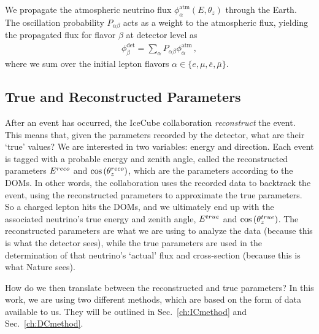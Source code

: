 We propagate the atmospheric neutrino flux $\phi_\alpha^\text{atm}(E,\theta_z)$ through the Earth.
The oscillation probability $P_{\alpha \beta}$ acts as a weight to the atmospheric flux, yielding the propagated flux for flavor $\beta$ at detector level as 
\begin{align}\label{eq:propFlux}
    \phi_\beta^\text{det} = \sum_\alpha P_{\alpha\beta} \phi_\alpha^\text{atm} \,,
\end{align}
where we sum over the initial lepton flavors $\alpha \in \{e,\mu, \bar{e}, \bar{\mu}\}$.

\subsection{True and Reconstructed Parameters}
After an event has occurred, the IceCube collaboration \emph{reconstruct} the event. 
This means that, given the parameters recorded by the detector, what are their `true' values?
We are interested in two variables: energy and direction. Each event is tagged with a probable energy and zenith angle, 
called the reconstructed parameters $E^{reco}$ and $\cos{(\theta_z^{reco})}$, which are the parameters according to the DOMs.
In other words, the collaboration uses the recorded data to backtrack the event, using the reconstructed parameters to approximate the true parameters. 
So a charged lepton hits the DOMs, and we ultimately end up with the associated neutrino's true energy and zenith angle, $E^{true}$ and $\cos{(\theta_z^{true})}$. 
The reconstructed parameters are what we are using to analyze the data (because this is what the detector sees), while the true parameters are used in the 
determination of that neutrino's `actual' flux and cross-section (because this is what Nature sees).

How do we then translate between the reconstructed and true parameters? 
In this work, we are using two different methods, which are based on the form of data available to us. 
They will be outlined in Sec.~\ref{ch:ICmethod} and Sec.~\ref{ch:DCmethod}.